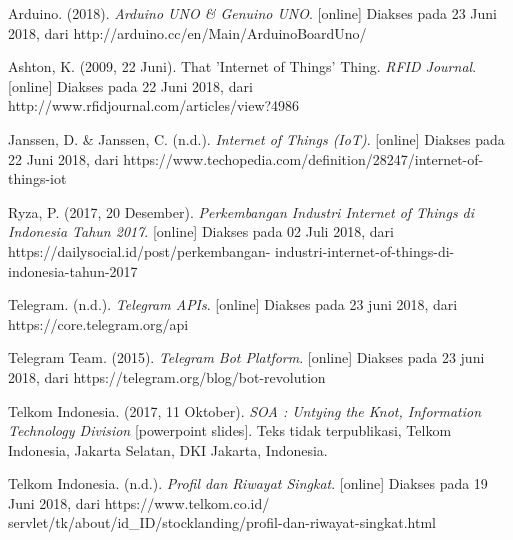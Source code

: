 \begin{thebibliography}{9}
	
	Arduino. (2018). \textit{Arduino UNO \& Genuino UNO}. [online] Diakses pada 23 Juni 2018, dari http://arduino.cc/en/Main/ArduinoBoardUno/
		
	Ashton, K. (2009, 22 Juni). That 'Internet of Things' Thing. \textit{RFID Journal}. [online] Diakses pada 22 Juni 2018, dari http://www.rfidjournal.com/articles/view?4986
	
	Janssen, D. \& Janssen, C. (n.d.). \textit{Internet of Things (IoT)}. [online] Diakses pada 22 Juni 2018, dari https://www.techopedia.com/definition/28247/internet-of-things-iot
	
	Ryza, P. (2017, 20 Desember). 
	\textit{Perkembangan Industri Internet of Things di Indonesia Tahun 2017}. [online] Diakses pada 02 Juli 2018, dari https://dailysocial.id/post/perkembangan- industri-internet-of-things-di-indonesia-tahun-2017
	
	Telegram. (n.d.). \textit{Telegram APIs}. [online] Diakses pada 23 juni 2018, dari https://core.telegram.org/api
	
	Telegram Team. (2015). \textit{Telegram Bot Platform}. [online] Diakses pada 23 juni 2018, dari https://telegram.org/blog/bot-revolution
	
	Telkom Indonesia. (2017, 11 Oktober). \textit{SOA : Untying the Knot, Information Technology Division} [powerpoint slides]. Teks tidak terpublikasi, Telkom Indonesia, Jakarta Selatan, DKI Jakarta, Indonesia. 
	
	Telkom Indonesia. (n.d.). \textit{Profil dan Riwayat Singkat}. [online] Diakses pada 19 Juni 2018, dari  https://www.telkom.co.id/ servlet/tk/about/id\_ID/stocklanding/profil-dan-riwayat-singkat.html
		
\end{thebibliography}
